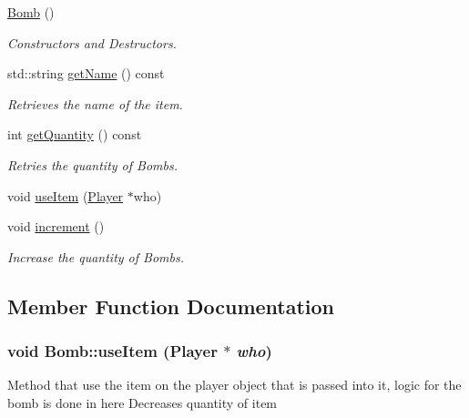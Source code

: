 \begin{DoxyCompactItemize}
\item 
\hypertarget{classBomb_a5805401b6cfbb451cf31ebd4851740cf}{
\hyperlink{classBomb_a5805401b6cfbb451cf31ebd4851740cf}{Bomb} ()}
\label{classBomb_a5805401b6cfbb451cf31ebd4851740cf}

\begin{DoxyCompactList}\small\item\em Constructors and Destructors. \item\end{DoxyCompactList}\item 
\hypertarget{classBomb_a7756be7b4e8425c84b27f98b39624b59}{
std::string \hyperlink{classBomb_a7756be7b4e8425c84b27f98b39624b59}{getName} () const }
\label{classBomb_a7756be7b4e8425c84b27f98b39624b59}

\begin{DoxyCompactList}\small\item\em Retrieves the name of the item. \item\end{DoxyCompactList}\item 
\hypertarget{classBomb_a24f4bc2a846224e23a3e0a9ebd7011ee}{
int \hyperlink{classBomb_a24f4bc2a846224e23a3e0a9ebd7011ee}{getQuantity} () const }
\label{classBomb_a24f4bc2a846224e23a3e0a9ebd7011ee}

\begin{DoxyCompactList}\small\item\em Retries the quantity of Bombs. \item\end{DoxyCompactList}\item 
void \hyperlink{classBomb_ae0472ffdfeb98f780e8c63967d4e81ed}{useItem} (\hyperlink{classPlayer}{Player} $\ast$who)
\item 
\hypertarget{classBomb_aea5f2bb72dec8d3c9346bd9398ab4eaa}{
void \hyperlink{classBomb_aea5f2bb72dec8d3c9346bd9398ab4eaa}{increment} ()}
\label{classBomb_aea5f2bb72dec8d3c9346bd9398ab4eaa}

\begin{DoxyCompactList}\small\item\em Increase the quantity of Bombs. \item\end{DoxyCompactList}\end{DoxyCompactItemize}


\subsection{Member Function Documentation}
\hypertarget{classBomb_ae0472ffdfeb98f780e8c63967d4e81ed}{
\subsubsection[{useItem}]{\setlength{\rightskip}{0pt plus 5cm}void Bomb::useItem ({\bf Player} $\ast$ {\em who})}}
\label{classBomb_ae0472ffdfeb98f780e8c63967d4e81ed}
Method that use the item on the player object that is passed into it, logic for the bomb is done in here Decreases quantity of item 

